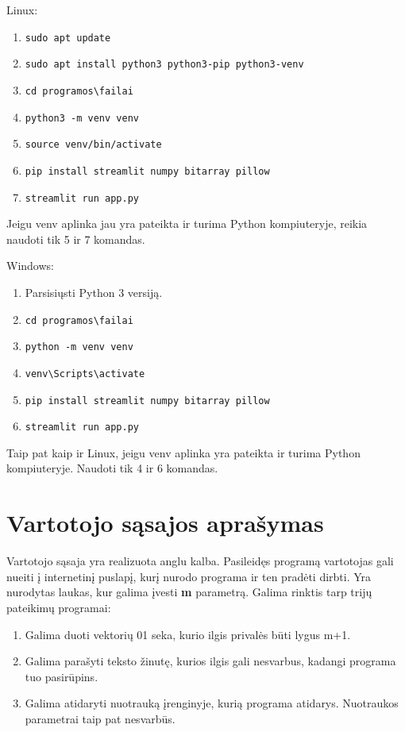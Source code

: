 \documentclass{article}
\begin{document}
Linux:
\begin{enumerate}
    \item \texttt{sudo apt update}
    \item \texttt{sudo apt install python3 python3-pip python3-venv}
    \item \texttt{cd programos\textbackslash failai}
    \item \texttt{python3 -m venv venv}
    \item \texttt{source venv/bin/activate}
    \item \texttt{pip install streamlit numpy bitarray pillow}
    \item \texttt{streamlit run app.py}
\end{enumerate}
Jeigu venv aplinka jau yra pateikta ir turima Python kompiuteryje, reikia naudoti tik 5 ir 7 komandas.

Windows:
\begin{enumerate}
    \item Parsisiųsti Python 3 versiją.
    \item \texttt{cd programos\textbackslash failai}
    \item \texttt{python -m venv venv}
    \item \texttt{venv\textbackslash Scripts\textbackslash activate}
    \item \texttt{pip install streamlit numpy bitarray pillow}
    \item \texttt{streamlit run app.py}
\end{enumerate}
Taip pat kaip ir Linux, jeigu venv aplinka yra pateikta ir turima Python kompiuteryje. Naudoti tik 4 ir 6 komandas.

\section{Vartotojo sąsajos aprašymas}
Vartotojo sąsaja yra realizuota anglu kalba. 
Pasileidęs programą vartotojas gali nueiti į internetinį puslapį, kurį nurodo programa ir ten pradėti dirbti.
Yra nurodytas laukas, kur galima įvesti \textbf{m} parametrą. Galima rinktis tarp trijų pateikimų programai: 
\begin{enumerate}
    \item Galima duoti vektorių 01 seka, kurio ilgis privalės būti lygus m+1.
    \item Galima parašyti teksto žinutę, kurios ilgis gali nesvarbus, kadangi programa tuo pasirūpins.
    \item Galima atidaryti nuotrauką įrenginyje, kurią programa atidarys. Nuotraukos parametrai taip pat nesvarbūs.
\end{enumerate}
\end{document}
